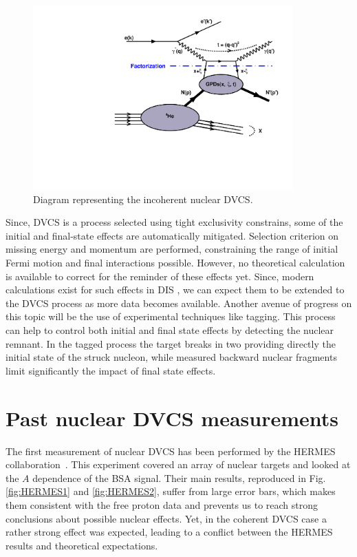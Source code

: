 \documentclass[aps,prc,preprint,superscriptaddress]{revtex4}
\begin{document}
\begin{figure}[tbp!]
\center
\includegraphics[width=10cm]{fig3/handbag_incoherent.pdf}
\caption{Diagram representing the incoherent nuclear DVCS.}
\label{fig:InCohDiag}
\end{figure}

Since, DVCS is a 
process selected using tight exclusivity constrains, some of the initial and final-state effects are
automatically mitigated. Selection criterion on missing energy and momentum are performed,
constraining the range of initial Fermi motion and final interactions possible. However, no theoretical
calculation is available to correct for the reminder of these effects yet. Since, modern calculations exist 
for such effects in DIS \cite{Cosyn:2017ekf}, we can expect them to be extended to the DVCS 
process as more data becomes available. Another avenue of progress
on this topic will be the use of experimental techniques like tagging. This process
can help to control both initial and final state effects by detecting the nuclear remnant.
In the tagged process the target breaks in two providing directly the initial state
of the struck nucleon, while measured backward nuclear fragments limit significantly the
impact of final state effects.

\section{Past nuclear DVCS measurements}

The first measurement of nuclear DVCS has been performed by the HERMES 
collaboration~\cite{Airapetian:2009cga}. This experiment covered an array of 
nuclear targets and looked at the $A$ dependence of the
BSA signal. Their main results, reproduced in Fig. \ref{fig:HERMES1} and \ref{fig:HERMES2}, suffer
from large error bars, which makes them consistent with the free proton data and prevents us to
reach strong conclusions about possible nuclear effects. Yet, in the coherent DVCS case a rather
strong effect was expected, leading to a conflict between the HERMES results and theoretical
expectations. 
\end{document}
